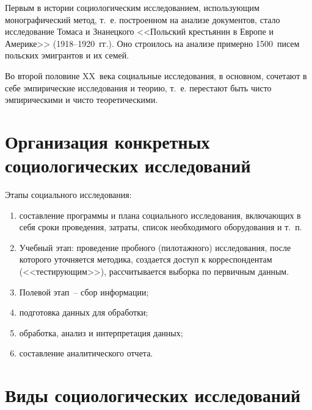   \charskip{*}
  
  Первым в истории социологическим исследованием, использующим монографический
  метод, т.~е. построенном на анализе документов, стало исследование Томаса и
  Знанецкого <<Польский крестьянин в Европе и Америке>> (1918--1920~гг.). Оно
  строилось на анализе примерно 1500~писем польских эмигрантов и их семей.
  
  Во второй половине XX~века социальные исследования, в основном, сочетают в
  себе эмпирические исследования и теорию, т.~е. перестают быть чисто
  эмпирическими и чисто теоретическими.

\section{Организация конкретных социологических исследований}

  Этапы социального исследования:
  \begin{enumerate}
    \item составление программы и плана социального исследования, включающих в
      себя сроки проведения, затраты, список необходимого оборудования и т.~п.
    \item Учебный этап: проведение пробного (пилотажного) исследования, после
      которого уточняется методика, создается доступ к корреспондентам
      (<<тестирующим>>), рассчитывается выборка по первичным данным.
    \item Полевой этап~-- сбор информации;
    \item подготовка данных для обработки;
    \item обработка, анализ и интерпретация данных;
    \item составление аналитического отчета.
  \end{enumerate}

\section{Виды социологических исследований}

